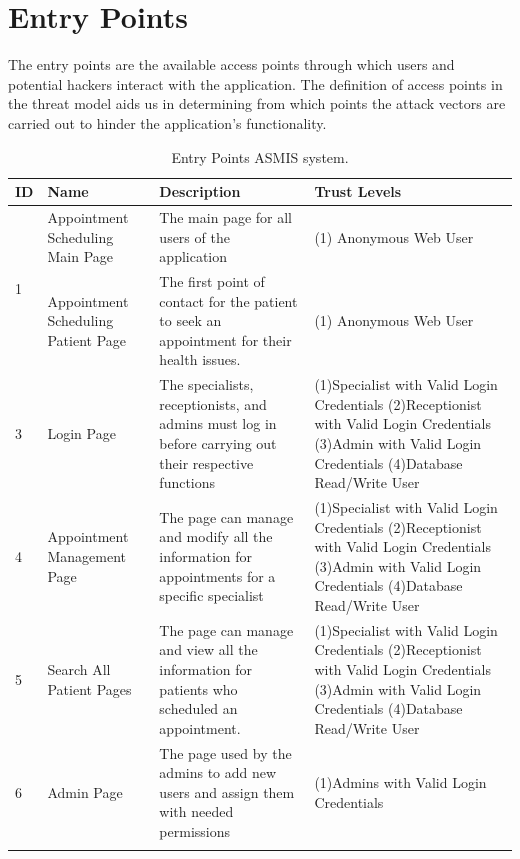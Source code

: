 \section{Entry Points}
The entry points are the available access points through which users and potential hackers interact with the application. The definition of access points in the threat model aids us in determining from which points the attack vectors are carried out to hinder the application's functionality.\newline

\begingroup
\centering
\setlength{\tabcolsep}{6.5pt} %
\renewcommand{\arraystretch}{1.8} %
\begin{longtable}{ |p{3cm}|p{3cm}|p{5cm}| p{3cm} |}
 \hline
 \textbf{ID} & \textbf{Name} & \textbf{Description} & \textbf{Trust Levels} \\ [0.5ex] 
 \hline
 \multirow{2}{5em}{1} & Appointment Scheduling Main Page & The main page for all users of the application & (1) Anonymous Web User \\
 \hline
 \multirow{2}{5em}{2} & Appointment Scheduling Patient Page & The first point of contact for the patient to seek an appointment for their health issues. & (1) Anonymous Web User \\
 \hline
 3 & Login Page & The specialists, receptionists, and admins must log in before carrying out their respective functions & 
 (1)Specialist with Valid Login Credentials \newline
 (2)Receptionist with Valid Login Credentials \newline
 (3)Admin with Valid Login Credentials \newline
 (4)Database Read/Write User
 \\
 \hline
 4 & Appointment Management Page & The page can manage and modify all the information for appointments for a specific specialist & 
 (1)Specialist with Valid Login Credentials \newline
 (2)Receptionist with Valid Login Credentials \newline
 (3)Admin with Valid Login Credentials \newline
 (4)Database Read/Write User\\
 \hline
  5 & Search All Patient Pages & The page can manage and view all the information for patients who scheduled an appointment. & 
 (1)Specialist with Valid Login Credentials \newline
 (2)Receptionist with Valid Login Credentials \newline
 (3)Admin with Valid Login Credentials \newline
 (4)Database Read/Write User
 \\
 \hline
 6 & Admin Page & The page used by the admins to add new users and assign them with needed permissions & 
 (1)Admins with Valid Login Credentials \newline \\
 \hline
 \caption{Entry Points ASMIS system.}
    \label{table:entry_points}
\end{longtable}
\endgroup

